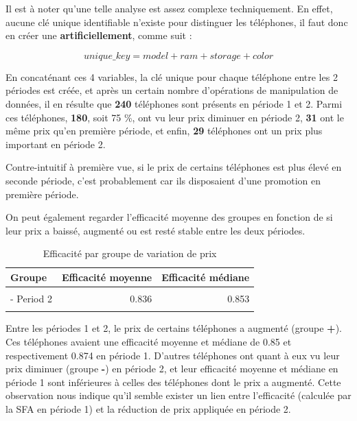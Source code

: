 \documentclass[
  12pt,
]{report}
\begin{document}
Il est à noter qu'une telle analyse est assez complexe techniquement. En
effet, aucune clé unique identifiable n'existe pour distinguer les
téléphones, il faut donc en créer une \textbf{artificiellement}, comme
suit :

\[
unique\_{key} = model + ram + storage + color
\]

En concaténant ces 4 variables, la clé unique pour chaque téléphone
entre les 2 périodes est créée, et après un certain nombre d'opérations
de manipulation de données, il en résulte que \textbf{240} téléphones
sont présents en période 1 et 2. Parmi ces téléphones, \textbf{180},
soit 75 \%, ont vu leur prix diminuer en période 2, \textbf{31} ont le
même prix qu'en première période, et enfin, \textbf{29} téléphones ont
un prix plus important en période 2.

Contre-intuitif à première vue, si le prix de certains téléphones est
plus élevé en seconde période, c'est probablement car ils disposaient
d'une promotion en première période.

On peut également regarder l'efficacité moyenne des groupes en fonction
de si leur prix a baissé, augmenté ou est resté stable entre les deux
périodes.

\begin{table}[!h]

\caption{\label{tab:unnamed-chunk-20}Efficacité par groupe de variation de prix}
\centering
\begin{tabular}[t]{lrr}
\toprule
\textbf{Groupe} & \textbf{Efficacité moyenne} & \textbf{Efficacité médiane}\\
\midrule
\cellcolor{gray!6}{+ Period 2} & \cellcolor{gray!6}{0.850} & \cellcolor{gray!6}{0.874}\\
- Period 2 & 0.836 & 0.853\\
\cellcolor{gray!6}{= Period 2} & \cellcolor{gray!6}{0.867} & \cellcolor{gray!6}{0.881}\\
\bottomrule
\end{tabular}
\end{table}

Entre les périodes 1 et 2, le prix de certains téléphones a augmenté
(groupe \textbf{+}). Ces téléphones avaient une efficacité moyenne et
médiane de 0.85 et respectivement 0.874 en période 1. D'autres
téléphones ont quant à eux vu leur prix diminuer (groupe \textbf{-}) en
période 2, et leur efficacité moyenne et médiane en période 1 sont
inférieures à celles des téléphones dont le prix a augmenté. Cette
observation nous indique qu'il semble exister un lien entre l'efficacité
(calculée par la SFA en période 1) et la réduction de prix appliquée en
période 2.
\end{document}
